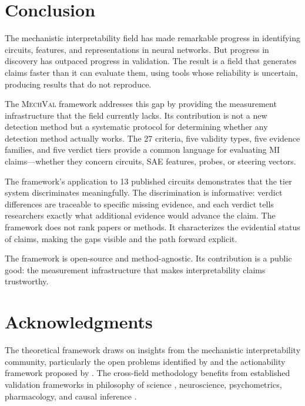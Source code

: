 \documentclass[10pt]{article}
\newcommand{\mechval}{\textsc{MechVal}}
\begin{document}
\section{Conclusion}
\label{sec:conclusion}

The mechanistic interpretability field has made remarkable progress in identifying circuits, features, and representations in neural networks. But progress in discovery has outpaced progress in validation. The result is a field that generates claims faster than it can evaluate them, using tools whose reliability is uncertain, producing results that do not reproduce.

The \mechval{} framework addresses this gap by providing the measurement infrastructure that the field currently lacks. Its contribution is not a new detection method but a systematic protocol for determining whether any detection method actually works. The 27 criteria, five validity types, five evidence families, and five verdict tiers provide a common language for evaluating MI claims---whether they concern circuits, SAE features, probes, or steering vectors.

The framework's application to 13 published circuits demonstrates that the tier system discriminates meaningfully. The discrimination is informative: verdict differences are traceable to specific missing evidence, and each verdict tells researchers exactly what additional evidence would advance the claim. The framework does not rank papers or methods. It characterizes the evidential status of claims, making the gaps visible and the path forward explicit.

The framework is open-source and method-agnostic. Its contribution is a public good: the measurement infrastructure that makes interpretability claims trustworthy.

\section*{Acknowledgments}

The theoretical framework draws on insights from the mechanistic interpretability community, particularly the open problems identified by \citet{sharkey2026open} and the actionability framework proposed by \citet{orgad2026actionable}. The cross-field methodology benefits from established validation frameworks in philosophy of science \citep{mayo2018statistical}, neuroscience, psychometrics, pharmacology, and causal inference \citep{pearl2009causality, spirtes2000causation}.
\end{document}
